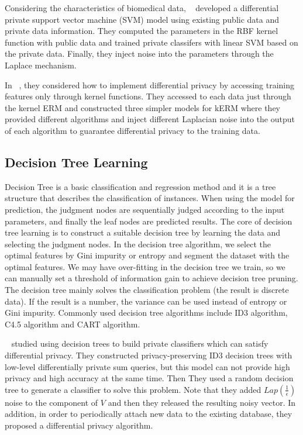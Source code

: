 \documentclass[draftclsnofoot,onecolumn,twoside]{IEEEtran}
\begin{document}
Considering the characteristics of biomedical data, ~\cite{Li2014Privacy} developed a differential private support vector machine (SVM) model using existing public data and private data information. They computed the parameters in the RBF kernel function with public data and trained private classifers with linear SVM based on the private data. Finally, they inject noise into the parameters through the Laplace mechanism.

In ~\cite{Jain2014Differentially}, they considered how to implement differential privacy by accessing training features only through kernel functions. They accessed to each data just through the kernel ERM and constructed three simpler models for kERM where they provided different algorithms and  inject different Laplacian noise into the output of each algorithm to guarantee differential privacy to the training data.

\subsection{Decision Tree Learning}
Decision Tree is a basic classification and regression method and it is a tree structure that describes the classification of instances.
When using the model for prediction, the judgment nodes are sequentially judged according to the input parameters, and finally the leaf nodes are predicted results. The core of decision tree learning is to construct a suitable decision tree by learning the data and selecting the judgment nodes. In the decision tree algorithm, we select the optimal features by Gini impurity or entropy and segment the dataset with the optimal features. We may have over-fitting in the decision tree we train, so we can manually set a threshold of information gain to achieve decision tree pruning. The decision tree mainly solves the classification problem (the result is discrete data). If the result is a number, the variance can be used instead of entropy or Gini impurity. Commonly used decision tree algorithms include ID3 algorithm, C4.5 algorithm and CART algorithm.

~\cite{Jagannathan2012A} studied using decision trees to build private classifiers which can satisfy differential privacy. They constructed privacy-preserving ID3 decision trees with low-level differentially private sum queries, but this model can not provide high privacy and high accuracy at the same time. Then They used a random decision tree to generate a classifier to solve this problem. Note that they added $Lap\left(\frac{1}{\epsilon}\right)$ noise to the component of $V$ and then they released the resulting noisy vector.
In addition, in order to periodically attach new data to the existing database, they proposed a differential privacy algorithm.
\end{document}
